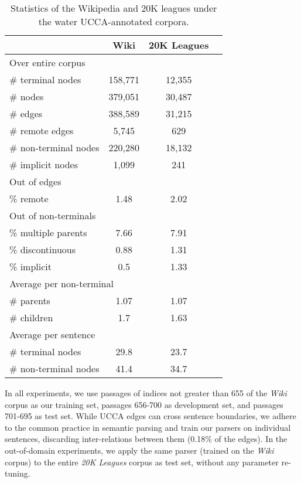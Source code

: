 \documentclass[11pt]{article}
\begin{document}
\begin{table}
\begin{tabular}{l|ccc}
& Wiki & 20K Leagues \\
\hline
\multicolumn{3}{l}{\footnotesize Over entire corpus} \\
\# terminal nodes & 158,771 & 12,355 \\
\# nodes & 379,051 & 30,487 \\
\# edges & 388,589 & 31,215 \\
\# remote edges & 5,745 & 629 \\
\# non-terminal nodes & 220,280 & 18,132 \\
\# implicit nodes & 1,099 & 241 \\
\multicolumn{3}{l}{\footnotesize Out of edges} \\
\% remote & 1.48 & 2.02 \\
\multicolumn{3}{l}{\footnotesize Out of non-terminals} \\
\% multiple parents & 7.66 & 7.91 \\
\% discontinuous & 0.88 & 1.31 \\
\% implicit & 0.5 & 1.33 \\
\multicolumn{3}{l}{\footnotesize Average per non-terminal} \\
\# parents & 1.07 & 1.07 \\
\# children & 1.7 & 1.63 \\
\multicolumn{3}{l}{\footnotesize Average per sentence} \\
\# terminal nodes & 29.8 & 23.7 \\
\# non-terminal nodes & 41.4 & 34.7 \\
\end{tabular}
\caption{Statistics of the Wikipedia and 20K leagues under the water
  UCCA-annotated corpora.}
\label{table:data}
\end{table}

In all experiments, we use passages of indices not greater than 655
of the \textit{Wiki} corpus as our training set, passages 656-700 as development set,
and passages 701-695 as test set.
While UCCA edges can cross sentence boundaries, we adhere to the common
practice in semantic parsing and train our parsers on individual sentences,
discarding inter-relations between them (0.18\% of the edges).
In the out-of-domain experiments, we apply the same parser (trained on the \textit{Wiki}
corpus) to the entire \textit{20K Leagues} corpus as test set,
without any parameter re-tuning.
\end{document}
